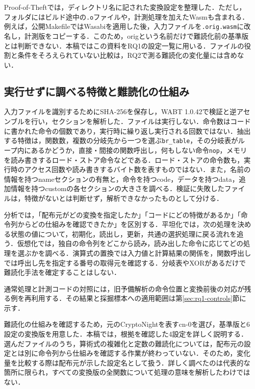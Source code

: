 \documentclass[submit,techrep]{ipsj}
\begin{document}
Proof-of-Theftでは，ディレクトリ名に記された変換設定を整理した．ただし，フォルダにはビルド途中の\texttt{.o}ファイルや，計測処理を加えたWasmも含まれる．例えば，公開MakefileではWasabiを適用した後，入力ファイルを\texttt{.orig.wasm}に改名し，計測版をコピーする．このため，origという名前だけで難読化前の基準版とは判断できない．本稿ではこの資料をRQ1の設定一覧に用いる．ファイルの役割と条件をそろえられていない比較は，RQ2で測る難読化の変化量には含めない．

\subsection{実行せずに調べる特徴と難読化の仕組み}
入力ファイルを識別するためにSHA-256を保存し，WABT 1.0.42で検証と逆アセンブルを行い，セクションを解析した．ファイルは実行しない．命令数はコードに書かれた命令の個数であり，実行時に繰り返し実行される回数ではない．抽出する特徴は，関数数，複数の分岐先から一つを選ぶ\texttt{br\_table}，その分岐表がループ内にあるかどうか，直接・間接の関数呼出し，何もしない命令\texttt{nop}，メモリを読み書きするロード・ストア命令などである．ロード・ストアの命令数も，実行時のアクセス回数や読み書きするバイト数を表すものではない．また，名前の情報を持つnameセクションの有無と，命令を持つcode，データを持つdata，追加情報を持つcustomの各セクションの大きさを調べる．検証に失敗したファイルは，特徴がないとは判断せず，解析できなかったものとして分ける．

分析では，「配布元がどの変換を指定したか」「コードにどの特徴があるか」「命令列からどの仕組みを確認できたか」を区別する．平坦化では，次の処理を決める状態の値について，初期化，読出し，更新，共通の選択処理に戻る流れを追う．仮想化では，独自の命令列をどこから読み，読み出した命令に応じてどの処理を選ぶかを調べる．演算式の置換では入力値と計算結果の関係を，関数呼出しでは呼出し先を指定する番号の取得元を確認する．分岐表やXORがあるだけで難読化手法を確定することはしない．

通常処理と計測コードの対照には，旧予備解析の命令位置と変換前後の対応が残る例を再利用する．その結果と採掘標本への適用範囲は第\ref{sec:rq1-controls}節に示す．

難読化の仕組みを確認するため，元のCryptoNightを表すcn-0を選び，基準版と6設定の変換版を用意した．本稿では，根拠を確認した4設定を詳しく説明する．選んだファイルのうち，算術式の複雑化と定数の難読化については，配布元の設定とは別に命令列から仕組みを確認する作業が終わっていない．そのため，変化量を比較する際は配布元が示した設定名として扱う．詳しく調べたのは代表的な箇所に限られ，すべての変換版の全関数について処理の意味を解析したわけではない．
\end{document}
